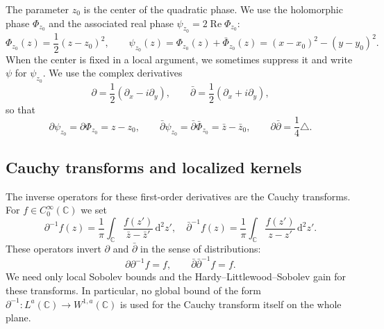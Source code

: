 \documentclass[a4paper,11pt]{article}
\newcommand{\pr}{\partial}
\newcommand{\Phiz}{\Phi_{z_0}}
\newcommand{\bPhiz}{\bar\Phi_{z_0}}
\newcommand{\psiz}{\psi_{z_0}}
\newcommand{\C}{\mathbb{C}}
\newcommand{\dd}{\,\text{d}}
\theoremstyle{plain}
\theoremstyle{definition}
\theoremstyle{remark}
\begin{document}
The parameter $z_0$ is the center of the quadratic phase. We use the holomorphic phase $\Phi_{z_0}$ and the associated real phase $\psi_{z_0}=2\operatorname{Re}\Phi_{z_0}$:
\begin{equation}
\Phiz(z)=\frac{1}{2}(z-z_0)^2,
\qquad
\psiz(z)=\Phiz(z)+\bPhiz(z)=(x-x_0)^2-(y-y_0)^2.
\end{equation}
When the center is fixed in a local argument, we sometimes suppress it and write $\psi$ for $\psi_{z_0}$.  We use the complex derivatives
\begin{equation}
\pr=\frac{1}{2}\left(\pr_x-i\pr_y\right),
\qquad
\bar\pr=\frac{1}{2}\left(\pr_x+i\pr_y\right),
\end{equation}
so that
\begin{equation}
\pr\psiz=\pr\Phiz=z-z_0,
\qquad
\bar\pr\psiz=\bar\pr\bPhiz=\bar z-\bar z_0,
\qquad
\pr\bar\pr=\frac{1}{4}\triangle.
\end{equation}

\subsection{Cauchy transforms and localized kernels}

The inverse operators for these first-order derivatives are the Cauchy transforms.  For $f\in C_0^\infty(\C)$ we set
\begin{equation}\label{cauchy-transforms-def}
\pr^{-1} f(z)=\frac{1}{\pi}\int_{\C}\frac{f(z')}{\bar z-\bar z'}\dd^2z',\quad
\bar \pr^{-1} f(z)=\frac{1}{\pi}\int_{\C}\frac{f(z')}{ z-z'}\dd^2z'.
\end{equation}
These operators invert $\partial$ and $\bar\partial$ in the sense of distributions:
\begin{equation*}
        \pr\pr^{-1}f=f,\qquad \bar\pr\bar\pr^{-1}f=f.
\end{equation*}
We need only local Sobolev bounds and the Hardy--Littlewood--Sobolev gain for these transforms.  In particular, no global bound of the form $\partial^{-1}:L^a(\C)\to W^{1,a}(\C)$ is used for the Cauchy transform itself on the whole plane.
\end{document}
